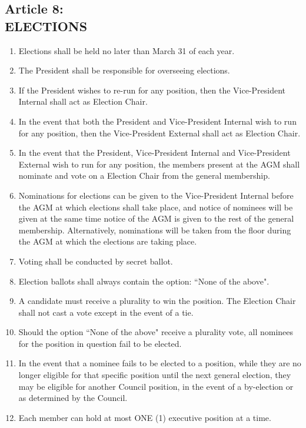 \documentclass[]{report}
\begin{document}
\clearpage
\begin{center}
	\section*{Article 8:\\ELECTIONS}
	\vspace{12px}
\end{center}
\label{elections}
	\renewcommand{\theenumi}{\Alph{enumi}}
	\begin{enumerate}
	
		\item Elections shall be held no later than March 31 of each year.
		\item The President shall be responsible for overseeing elections.
		\item If the President wishes to re-run for any position, then the Vice-President Internal shall act as Election Chair. 
		\item In the event that both the President and Vice-President Internal wish to run for any position, then the Vice-President External shall act as Election Chair. 
		\item In the event that the President, Vice-President Internal and Vice-President External wish to run for any position, the members present at the AGM shall nominate and vote on a Election Chair from the general membership.
		\item Nominations for elections can be given to the Vice-President Internal before the AGM at which elections shall take place, and notice of nominees will be given at the same time notice of the AGM is given to the rest of the general membership. Alternatively, nominations will be taken from the floor during the AGM at which the elections are taking place. 
		\item Voting shall be conducted by secret ballot.
		\item Election ballots shall always contain the option: ``None of the above".
		\item A candidate must receive a plurality to win the position. The Election Chair shall not cast a vote except in the event of a tie.
		\item Should the option ``None of the above" receive a plurality vote, all nominees for the position in question fail to be elected.
		\item In the event that a nominee fails to be elected to a position, while they are no longer eligible for that specific position until the next general election, they may be eligible for another Council position, in the event of a by-election or as determined by the Council.
		\item Each member can hold at most ONE (1) executive position at a time.
	
	\end{enumerate}
\end{document}
